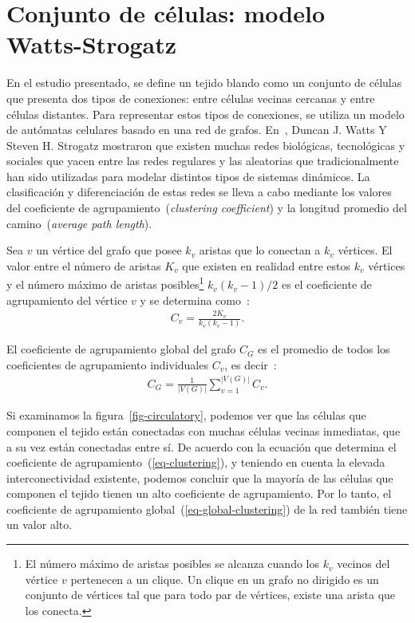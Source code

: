 \section{Conjunto de c\'elulas: modelo Watts-Strogatz}

En el estudio presentado, se define un tejido blando como un conjunto de células que presenta dos tipos de conexiones: entre células vecinas cercanas y entre células distantes. Para representar estos tipos de conexiones, se utiliza un modelo de autómatas celulares basado en una red de grafos. En~\cite{watts}, Duncan J. Watts Y Steven H. Strogatz mostraron que existen muchas redes biol\'ogicas, tecnol\'ogicas y sociales que yacen entre las redes regulares y las aleatorias que tradicionalmente han sido utilizadas para modelar distintos tipos de sistemas din\'amicos. La clasificaci\'on y diferenciaci\'on de estas redes se lleva a cabo mediante los valores del coeficiente de agrupamiento~(\emph{clustering coefficient}) y la longitud promedio del camino~(\emph{average path length}). 

\begin{definition} 
\label{def-clustering}
Sea $v$ un v\'ertice del grafo que posee $k_v$ aristas que lo conectan a $k_v$ v\'ertices. El valor entre el n\'umero de aristas $K_v$ que existen en realidad entre estos $k_v$ v\'ertices y el n\'umero m\'aximo de aristas posibles\footnote{El n\'umero m\'aximo de aristas posibles se alcanza cuando los $k_v$ vecinos del v\'ertice $v$ pertenecen a un clique. Un clique en un grafo no dirigido es un conjunto de v\'ertices tal que para todo par de v\'ertices, existe una arista que los conecta.} $k_v(k_v-1)/2$ es el coeficiente de agrupamiento del v\'ertice $v$ y se determina como~\cite{viabarre2019}:
\begin{align}
C_v = \displaystyle\frac{2K_v}{k_v(k_v-1)}. \label{eq-clustering}
\end{align}
\end{definition}

\begin{definition}
\label{def-global-clustering}
El coeficiente de agrupamiento global del grafo $C_G$ es el promedio de todos los coeficientes de agrupamiento individuales $C_v$, es decir~\cite{viabarre2019}:
\begin{align}
C_G = \displaystyle\frac{1}{|V(G)|}\sum _{v=1} ^{|V(G)|} C_v. \label{eq-global-clustering}
\end{align}
\end{definition}

Si examinamos la figura~\ref{fig-circulatory}, podemos ver que las células que componen el tejido están conectadas con muchas células vecinas inmediatas, que a su vez están conectadas entre sí. De acuerdo con la ecuación que determina el coeficiente de agrupamiento~(\ref{eq-clustering}), y teniendo en cuenta la elevada interconectividad existente, podemos concluir que la mayoría de las células que componen el tejido tienen un alto coeficiente de agrupamiento. Por lo tanto, el coeficiente de agrupamiento global~(\ref{eq-global-clustering}) de la red también tiene un valor alto.

